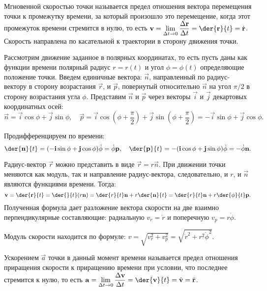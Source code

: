 
Мгновенной скоростью точки называется предел отношения вектора перемещения
точки к промежутку времени, за который произошло это перемещение, когда этот
промежуток времени стремится в нулю, то есть \( \ds \vec{v} = \lim_{\D t\to 0}
\Der{\vec{r}}{t} = \der{\vec{r}}{t} = \dot{\vec{r}} \). Скорость направлена по
касательной к траектории в сторону движения точки.

Рассмотрим движение заданное в полярных координатах, то есть пусть даны как
функции времени полярный радиус \( r = r(t) \) и угол \( \phi = \phi (t) \)
определяющие положение точки. Введем единичные вектора: \( \vec{n} \),
направленный по радиус-вектору в сторону возрастания \( \vec{r} \), и
\( \vec{p} \), повернутый относительно \( \vec{n} \) на угол \( \pi/2 \) в
сторону возрастания угла \( \phi \). Представим \( \vec{n} \) и \( \vec{p} \)
через векторы \( \vec{i} \) и \( \vec{j} \) декартовых координатных осей:
\[
    \vec{n} = \vec{i}\cos\phi + \vec{j}\sin\phi, \quad
    \vec{p} = \vec{i}\cos\left(\phi + \frac{\pi}{2}\right) + \vec{j}\sin\left(
    \phi + \frac{\pi}{2}\right) = -\vec{i}\sin\phi + \vec{j}\cos\phi.
\]

Продифференцируем по времени:
\[
    \der{\vec{n}}{t} = (-\vec{i}\sin\phi + \vec{j}\cos\phi)\dot{\phi} =
    \dot{\phi}\vec{p}, \quad \der{\vec{p}}{t} = -(\vec{i}\cos\phi +
    \vec{j}\sin\phi)\dot{\phi} = -\dot{\phi}\vec{n}.
\]

Радиус-вектор \( \vec{r} \) можно представить в виде \( \vec{r} = r\vec{n} \).
При движении точки меняются как модуль, так и направление радиус-вектора,
следовательно, и \( r \), и \( \vec{n} \) являются функциями времени. Тогда:
\[
    \vec{v} = \der{\vec{r}}{t} = \der{}{t}(r\vec{n}) = \der{r}{t}\vec{n} +
    r\der{\vec{n}}{t} = \der{r}{t}\vec{n} + r\der{\phi}{t}\vec{p}.
\]
Полученная формула дает разложение вектора скорости на две взаимно
перпендикулярные составляющие: радиальную \( v_r = \dot{r} \) и поперечную
\( v_p = r\dot{\phi} \).

Модуль скорости находится по формуле: \( v = \sqrt{v_r^2 + v_p^2} =
\sqrt{\dot{r}^2 + r^2\dot{\phi}^2} \).

Ускорением \( \vec{a} \) точки в данный момент времени называется предел
отношения приращения скорости к приращению времени при условии, что последнее
стремится к нулю, то есть \( \ds \vec{a} = \lim_{\D t\to 0} \Der{\vec{v}}{t} =
\der{\vec{v}}{t} = \dot{\vec{v}} = \ddot{\vec{r}} \).
 
